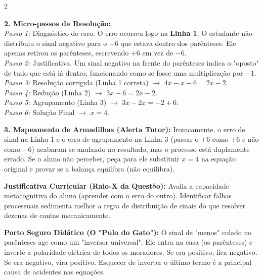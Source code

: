 \begin{multicols*}{2}
\begin{tcolorbox}[colback=CorTitUm!5, colframe=CorTitUm, boxrule=1pt, arc=4pt, left=6pt, right=6pt, top=6pt, bottom=6pt]
    \textbf{2. Micro-passos da Resolução:}\\
    \textit{Passo 1:} Diagnóstico do erro. O erro ocorreu logo na \textbf{Linha 1}. O estudante não distribuiu o sinal negativo para o $+6$ que estava dentro dos parênteses. Ele apenas retirou os parênteses, escrevendo $+6$ em vez de $-6$.\\
    \textit{Passo 2:} Justificativa. Um sinal negativo na frente do parênteses indica o "oposto" de tudo que está lá dentro, funcionando como se fosse uma multiplicação por $-1$.\\
    \textit{Passo 3:} Resolução corrigida (Linha 1 correta) $\rightarrow$ $4x - x - 6 = 2x - 2$.\\
    \textit{Passo 4:} Redução (Linha 2) $\rightarrow$ $3x - 6 = 2x - 2$.\\
    \textit{Passo 5:} Agrupamento (Linha 3) $\rightarrow$ $3x - 2x = -2 + 6$.\\
    \textit{Passo 6:} Solução Final $\rightarrow$ $x = 4$.\par\vspace{0.1cm}
    
    \textbf{3. Mapeamento de Armadilhas (Alerta Tutor):} Ironicamente, o erro de sinal na Linha 1 e o erro de agrupamento na Linha 3 (passar o $+6$ como $+6$ e não como $-6$) acabaram se anulando no resultado, mas o processo está duplamente errado. Se o aluno não perceber, peça para ele substituir $x = 4$ na equação original e provar se a balança equilibra (não equilibra).
    \end{tcolorbox}
    \vspace{0.15cm}
    
    \begin{boxexplicacao}
    \textbf{Justificativa Curricular (Raio-X da Questão):} Avalia a capacidade metacognitiva do aluno (aprender com o erro do outro). Identificar falhas processuais sedimenta melhor a regra de distribuição de sinais do que resolver dezenas de contas mecanicamente.
    \end{boxexplicacao}

    \begin{boxexplicacao}
    \textbf{Porto Seguro Didático (O "Pulo do Gato"):} O sinal de "menos" colado no parênteses age como um "inversor universal". Ele entra na casa (os parênteses) e inverte a polaridade elétrica de todos os moradores. Se era positivo, fica negativo. Se era negativo, vira positivo. Esquecer de inverter o último termo é a principal causa de acidentes nas equações.
    \end{boxexplicacao}
\fi


\end{multicols*}

